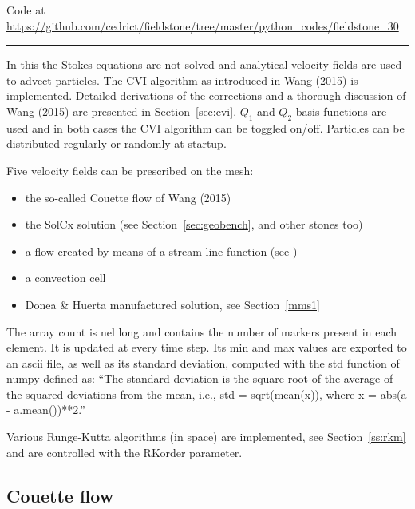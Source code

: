 

\begin{center}
Code at \url{https://github.com/cedrict/fieldstone/tree/master/python_codes/fieldstone_30}
\end{center}

\par\noindent\rule{\textwidth}{0.4pt}

In this \stone the Stokes equations are not solved and analytical 
velocity fields are used to advect particles. The CVI algorithm 
as introduced in Wang \etal (2015) \cite{waav15} is implemented.
Detailed derivations of the corrections and a thorough discussion 
of Wang \etal (2015) are presented in Section~\ref{sec:cvi}.
$Q_1$ and $Q_2$ basis functions are used and in both cases the CVI algorithm can be toggled on/off. 
Particles can be distributed regularly or randomly at startup.

Five velocity fields can be prescribed on the mesh:
\begin{itemize}
\item the so-called Couette flow of Wang \etal (2015) \cite{waav15} 
\item the SolCx solution (see Section~\ref{sec:geobench}, and  other stones too)
\item a flow created by means of a stream line function (see )
\item a convection cell 
\item Donea \& Huerta manufactured solution, see Section~\ref{mms1}
\end{itemize}

The array {\python count} is {\python nel} long and contains the number of markers present in each element.
It is updated at every time step. Its min and max values are exported to an ascii file, as well 
as its standard deviation, computed with the {\python std} function of numpy defined as:
``The standard deviation is the square root of the average of the squared deviations from the mean, 
i.e., std = sqrt(mean(x)), where x = abs(a - a.mean())**2.''

Various Runge-Kutta algorithms (in space) are implemented, see Section~\ref{ss:rkm} and are 
controlled with the {\python RKorder} parameter.

\subsection*{Couette flow}


